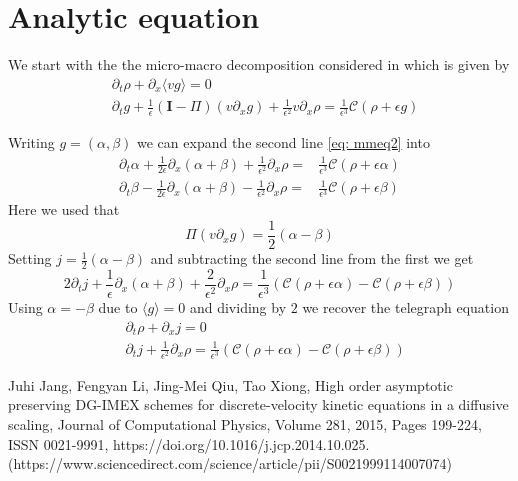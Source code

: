\documentclass[]{article}
\title{}
\author{}
\begin{document}
\maketitle

\section{Analytic equation}

We start with the the micro-macro decomposition considered in \cite{JaLiQiXi2014} which is given by
\begin{subequations}
\begin{align}
& \partial_t \rho + \partial_x \langle v g \rangle = 0 \label{eq: mmeq1} \\
& \partial_t g + \frac{1}{\epsilon} (\mathbf{I} - \Pi) (v \partial_x g) + \frac{1}{\epsilon^2} v \partial_x \rho= \frac{1}{\epsilon^3} \mathcal{C}(\rho + \epsilon g) \label{eq: mmeq2}
\end{align}
\end{subequations}

Writing $g = (\alpha, \beta)$ we can expand the second line \eqref{eq: mmeq2} into
\begin{align*}
\partial_t \alpha + \frac{1}{2 \epsilon} \partial_x (\alpha + \beta)+ \frac{1}{\epsilon^2} \partial_x \rho = & \frac{1}{\epsilon^3} \mathcal{C}(\rho + \epsilon \alpha)\\
\partial_t \beta - \frac{1}{2\epsilon} \partial_x (\alpha + \beta)- \frac{1}{\epsilon^2} \partial_x \rho = & \frac{1}{\epsilon^3} \mathcal{C}(\rho + \epsilon \beta)
\end{align*}
Here we used that
\[
\Pi (v \partial_x g) = \frac{1}{2}(\alpha - \beta)
\]
Setting $j = \frac{1}{2}(\alpha - \beta)$ and subtracting the second line from the first we get
\[
2 \partial_t j + \frac{1}{\epsilon} \partial_x (\alpha + \beta) + \frac{2}{\epsilon^2} \partial_x \rho = \frac{1}{\epsilon^3} (\mathcal{C}(\rho + \epsilon \alpha) - \mathcal{C}(\rho + \epsilon \beta)) 
\]
Using $\alpha = -\beta$ due to $\langle g \rangle = 0$ and dividing by $2$ we recover the telegraph equation
\begin{align*}
& \partial_t \rho + \partial_x j = 0\\
& \partial_t j + \frac{1}{\epsilon^2} \partial_x \rho = \frac{1}{\epsilon^3} (\mathcal{C}(\rho + \epsilon \alpha) - \mathcal{C}(\rho + \epsilon \beta)) 
\end{align*}

\begin{thebibliography}{9}
	Juhi Jang, Fengyan Li, Jing-Mei Qiu, Tao Xiong,
	High order asymptotic preserving DG-IMEX schemes for discrete-velocity kinetic equations in a diffusive scaling,
	Journal of Computational Physics,
	Volume 281,
	2015,
	Pages 199-224,
	ISSN 0021-9991,
	https://doi.org/10.1016/j.jcp.2014.10.025.
	(https://www.sciencedirect.com/science/article/pii/S0021999114007074)
\end{thebibliography}
\end{document}
